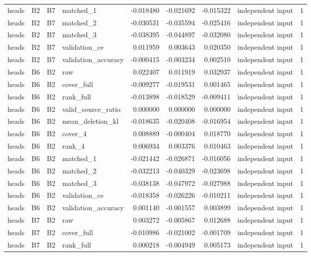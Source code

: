 \begin{tabular}{llllrrrlr}
heads & B2 & B7 & matched_1 & -0.018480 & -0.021692 & -0.015322 & independent input & 1 \\
heads & B2 & B7 & matched_2 & -0.030531 & -0.035594 & -0.025416 & independent input & 1 \\
heads & B2 & B7 & matched_3 & -0.038395 & -0.044897 & -0.032080 & independent input & 1 \\
heads & B2 & B7 & validation_ce & 0.011959 & 0.003643 & 0.020350 & independent input & 1 \\
heads & B2 & B7 & validation_accuracy & -0.000415 & -0.003234 & 0.002510 & independent input & 1 \\
heads & B6 & B2 & raw & 0.022407 & 0.011919 & 0.032937 & independent input & 1 \\
heads & B6 & B2 & cover_full & -0.009277 & -0.019531 & 0.001465 & independent input & 1 \\
heads & B6 & B2 & rank_full & -0.013898 & -0.018529 & -0.009411 & independent input & 1 \\
heads & B6 & B2 & valid_source_ratio & 0.000000 & 0.000000 & 0.000000 & independent input & 1 \\
heads & B6 & B2 & mean_deletion_kl & -0.018635 & -0.020408 & -0.016954 & independent input & 1 \\
heads & B6 & B2 & cover_4 & 0.008889 & -0.000404 & 0.018770 & independent input & 1 \\
heads & B6 & B2 & rank_4 & 0.006934 & 0.003376 & 0.010463 & independent input & 1 \\
heads & B6 & B2 & matched_1 & -0.021442 & -0.026871 & -0.016056 & independent input & 1 \\
heads & B6 & B2 & matched_2 & -0.032213 & -0.040329 & -0.023698 & independent input & 1 \\
heads & B6 & B2 & matched_3 & -0.038138 & -0.047972 & -0.027988 & independent input & 1 \\
heads & B6 & B2 & validation_ce & -0.018358 & -0.026226 & -0.010211 & independent input & 1 \\
heads & B6 & B2 & validation_accuracy & 0.001140 & -0.001557 & 0.003899 & independent input & 1 \\
heads & B7 & B2 & raw & 0.003272 & -0.005867 & 0.012688 & independent input & 1 \\
heads & B7 & B2 & cover_full & -0.010986 & -0.021002 & -0.001709 & independent input & 1 \\
heads & B7 & B2 & rank_full & 0.000218 & -0.004949 & 0.005173 & independent input & 1 \\

\end{tabular}
